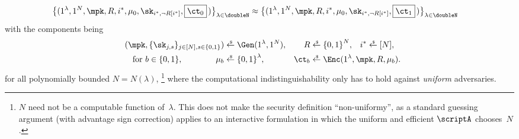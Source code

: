 \begin{definition}
\begin{align*}
\WideNarrow{}{&}
\bigl\{(
1^\lambda,1^N,\mpk,R,i^\ast,\mu_0,\sk_{i^\ast,\neg R[i^\ast]},\boxed{\ct_0}\,
)\bigr\}_{\lambda\in\doubleN}
\WideNarrow{}{\\}
{}\approx{}&
\bigl\{(
1^\lambda,1^N,\mpk,R,i^\ast,\mu_0,\sk_{i^\ast,\neg R[i^\ast]},\boxed{\ct_1}\,
)\bigr\}_{\lambda\in\doubleN}
\end{align*}
with the components being
\begin{align*}
(\mpk,\{\sk_{j,s}\}_{j\in[N],s\in\bit})
&{}\draws\Gen(1^\lambda,1^N),&
R&{}\draws\bit^N,&
i^\ast&{}\draws[N],\\
\textup{for }b\in\bit,\WideNarrow{\qquad}{}\qquad
\mu_b&{}\draws\bit^\lambda,&
\ct_b&\mathrlap{{}\draws\Enc(1^\lambda,\mpk,R,\mu_b).}
\end{align*}
for all polynomially bounded ${N=N(\lambda)}$,%
\footnote{$N$ need not be a computable function of~$\lambda$.
This does not make the security definition ``non-uniformy'',
as a standard guessing argument (with advantage sign correction) applies to an interactive formulation
in which the uniform and efficient $\scriptA$ chooses~$N$.}
where the computational indistinguishability only has to hold against \emph{uniform} adversaries.
\end{definition}

